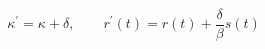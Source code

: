 \documentclass{article}
\begin{document}
\fontsize{22}{29}\selectfont
\[
\kappa^{\prime}=\kappa+\delta,\qquad r^{\prime}(t)=r(t)+\frac{\delta}{\beta}s(t)
\]
\end{document}
